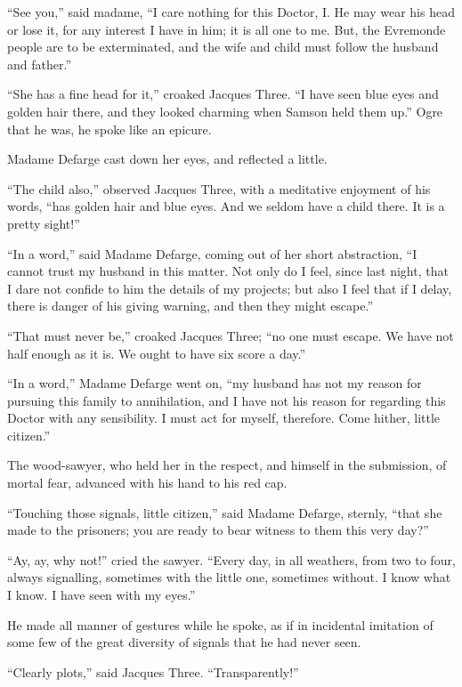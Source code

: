 ``See you,'' said madame, ``I care nothing for this Doctor, I.  He may
wear his head or lose it, for any interest I have in him; it is all
one to me. But, the Evremonde people are to be exterminated, and the
wife and child must follow the husband and father.''

``She has a fine head for it,'' croaked Jacques Three.  ``I have seen
blue eyes and golden hair there, and they looked charming when Samson
held them up.''  Ogre that he was, he spoke like an epicure.

Madame Defarge cast down her eyes, and reflected a little.

``The child also,'' observed Jacques Three, with a meditative enjoyment
of his words, ``has golden hair and blue eyes.  And we seldom have a
child there.  It is a pretty sight!''

``In a word,'' said Madame Defarge, coming out of her short abstraction,
``I cannot trust my husband in this matter.  Not only do I feel, since
last night, that I dare not confide to him the details of my projects;
but also I feel that if I delay, there is danger of his giving warning,
and then they might escape.''

``That must never be,'' croaked Jacques Three; ``no one must escape.
We have not half enough as it is.  We ought to have six score a day.''

``In a word,'' Madame Defarge went on, ``my husband has not my reason
for pursuing this family to annihilation, and I have not his reason
for regarding this Doctor with any sensibility.  I must act for myself,
therefore.  Come hither, little citizen.''

The wood-sawyer, who held her in the respect, and himself in the
submission, of mortal fear, advanced with his hand to his red cap.

``Touching those signals, little citizen,'' said Madame Defarge,
sternly, ``that she made to the prisoners; you are ready to bear
witness to them this very day?''

``Ay, ay, why not!'' cried the sawyer.  ``Every day, in all weathers,
from two to four, always signalling, sometimes with the little one,
sometimes without.  I know what I know.  I have seen with my eyes.''

He made all manner of gestures while he spoke, as if in incidental
imitation of some few of the great diversity of signals that he had
never seen.

``Clearly plots,'' said Jacques Three.  ``Transparently!''

